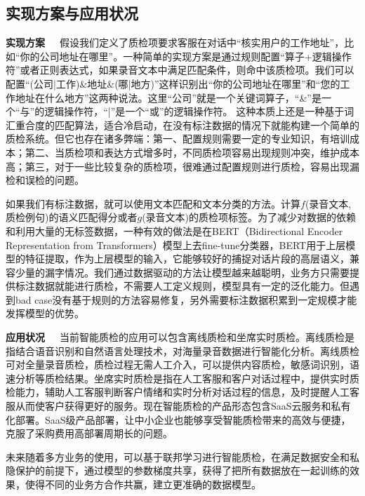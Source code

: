 \subsection{实现方案与应用状况}
\textbf{实现方案}~~~假设我们定义了质检项要求客服在对话中“核实用户的工作地址”，比如“你的公司地址在哪里”。一种简单的实现方案是通过规则配置“算子+逻辑操作符”或者正则表达式，如果录音文本中满足匹配条件，则命中该质检项。我们可以配置“(公司|工作)\&地址\&(哪|地方)”这样识别出“你的公司地址在哪里”和“您的工作地址在什么地方”这两种说法。这里“公司”就是一个关键词算子，“\&”是一个“与”的逻辑操作符，“|”是一个“或”的逻辑操作符。
这种本质上还是一种基于词汇重合度的匹配算法，适合冷启动，在没有标注数据的情况下就能构建一个简单的质检系统。但它也存在诸多弊端：第一、配置规则需要一定的专业知识，有培训成本；第二、当质检项和表达方式增多时，不同质检项容易出现规则冲突，维护成本高；第三，对于一些比较复杂的质检项，很难通过配置规则进行质检，容易出现漏检和误检的问题。

如果我们有标注数据，就可以使用文本匹配和文本分类的方法。计算$f$(录音文本,质检例句)的语义匹配得分或者$g$(录音文本)的质检项标签。为了减少对数据的依赖和利用大量的无标签数据，一种有效的做法是在BERT（Bidirectional Encoder Representation from Transformers）模型上去fine-tune分类器，BERT用于上层模型的特征提取，作为上层模型的输入，它能够较好的捕捉对话片段的高层语义，兼容少量的漏字情况。我们通过数据驱动的方法让模型越来越聪明，业务方只需要提供标注数据就能进行质检，不需要人工定义规则，模型具有一定的泛化能力。但遇到bad case没有基于规则的方法容易修复，另外需要标注数据积累到一定规模才能发挥模型的优势。

\textbf{应用状况}~~~当前智能质检的应用可以包含离线质检和坐席实时质检。离线质检是指结合语音识别和自然语言处理技术，对海量录音数据进行智能化分析。离线质检可对全量录音质检，质检过程无需人工介入，可以提供内容质检，敏感词识别，语速分析等质检结果。坐席实时质检是指在人工客服和客户对话过程中，提供实时质检能力，辅助人工客服判断客户情绪和实时分析对话过程的信息，及时提醒人工客服从而使客户获得更好的服务。现在智能质检的产品形态包含SaaS云服务和私有化部署。SaaS级产品部署，让中小企业也能够享受智能质检带来的高效与便捷，克服了采购费用高部署周期长的问题。

未来随着多方业务的使用，可以基于联邦学习进行智能质检，在满足数据安全和私隐保护的前提下，通过模型的参数梯度共享，获得了把所有数据放在一起训练的效果，使得不同的业务方合作共赢，建立更准确的数据模型。

